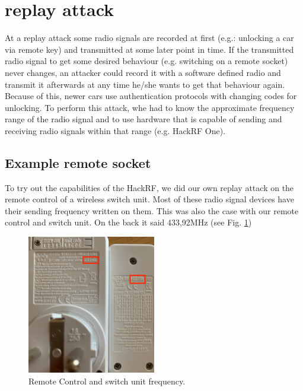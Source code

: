 \documentclass[conference]{IEEEtran}
\begin{document}
\section{replay attack} %
\label{replayattack}

At a replay attack some radio signals are recorded at first (e.g.: unlocking a car via remote key) and transmitted at some later point in time.  If the transmitted radio signal to get some desired behaviour (e.g. switching on a remote socket) never changes, an attacker could record it with a software defined radio and transmit it afterwards at any time he/she wants to get that behaviour again. Because of this, newer cars use authentication protocols with changing codes for unlocking. \cite{verdult2015cryptanalysis}To perform this attack, whe had to know the approximate frequency range of the radio signal and to use hardware that is capable of sending and receiving radio signals within that range (e.g. HackRF One). 

\subsection{Example remote socket}
To try out the capabilities of the HackRF, we did our own replay attack on the remote control of a wireless switch unit. Most of these radio signal devices have their sending frequency written on them. This was also the case with our remote control and switch unit. On the back it said 433,92MHz (see Fig. \ref{fig:remote})

\begin{figure}[H]
	\centering
	\includegraphics[width=0.5\textwidth]{remote_control_and_switch}
	\caption{Remote Control and switch unit frequency.}
	\label{fig:remote}
\end{figure}
\end{document}
